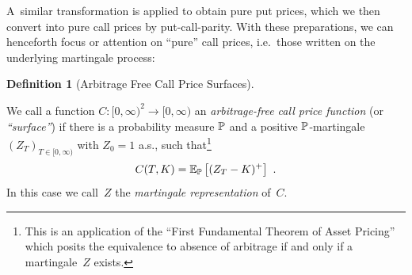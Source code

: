 \documentclass[twoside]{article}
\theoremstyle{plain}
\theoremstyle{definition}
\newtheorem{definition}[theorem]{Definition}
\theoremstyle{remark}
\begin{document}
A~similar transformation is applied to obtain pure put prices, which we then convert
into pure call prices by put-call-parity. 
With these preparations, we can henceforth focus or attention on ``pure'' call prices, i.e.~those written on the underlying martingale process:\\


\begin{definition}[Arbitrage Free Call Price Surfaces]\label{def:arbfreecall}

We call a function $C:[0,\infty)^2 \rightarrow [0,\infty)$ an \emph{arbitrage-free call price function} (or \emph{``surface''}) if 
    there is a probability measure $\P$  and a positive $\P$-martingale $(Z_T)_{T\in [0,\infty)}$
    with $Z_0=1$ a.s.,
    such that\footnote{This is an application of
    the ``First Fundamental Theorem of Asset Pricing''~\cite{delbaen2006general}
    which posits the equivalence to absence of arbitrage if and only if 
    a martingale~$Z$ exists.}
    $$
        C(T,K) = \E_\P\left[ (Z_T-K)^+ \right] \ .
    $$
    In this case we call~$Z$ the \emph{martingale representation} of~$C$.
\end{definition}
\end{document}

